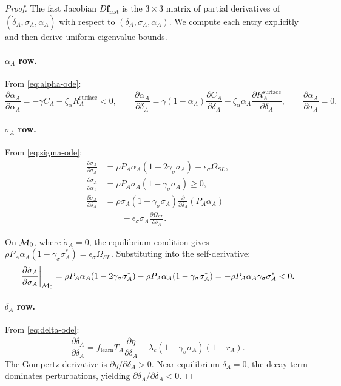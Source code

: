 \begin{proof}
The fast Jacobian $D\mathbf{f}_{\mathrm{fast}}$ is the $3 \times 3$ matrix
of partial derivatives of $(\dot{\delta}_A, \dot{\sigma}_A, \dot{\alpha}_A)$
with respect to $(\delta_A, \sigma_A, \alpha_A)$. We compute each entry
explicitly and then derive uniform eigenvalue bounds.

\paragraph{$\alpha_A$ row.}
From \eqref{eq:alpha-ode}:
\[
\frac{\partial \dot{\alpha}_A}{\partial \alpha_A}
= -\gamma C_A - \zeta_\alpha R_A^{\mathrm{surface}} < 0,
\qquad
\frac{\partial \dot{\alpha}_A}{\partial \delta_A}
= \gamma (1 - \alpha_A) \frac{\partial C_A}{\partial \delta_A}
- \zeta_\alpha \alpha_A \frac{\partial R_A^{\mathrm{surface}}}{\partial \delta_A},
\qquad
\frac{\partial \dot{\alpha}_A}{\partial \sigma_A} = 0.
\]

\paragraph{$\sigma_A$ row.}
From \eqref{eq:sigma-ode}:
\begin{align*}
\frac{\partial \dot{\sigma}_A}{\partial \sigma_A}
&= \rho P_A \alpha_A (1 - 2\gamma_\sigma \sigma_A) - \epsilon_\sigma \Omega_{SL},\\[2pt]
\frac{\partial \dot{\sigma}_A}{\partial \alpha_A}
&= \rho P_A \sigma_A (1 - \gamma_\sigma \sigma_A) \geq 0,\\[2pt]
\frac{\partial \dot{\sigma}_A}{\partial \delta_A}
&= \rho \sigma_A (1 - \gamma_\sigma \sigma_A) \frac{\partial}{\partial \delta_A}(P_A \alpha_A) \\
&\qquad - \epsilon_\sigma \sigma_A \frac{\partial \Omega_{SL}}{\partial \delta_A}.
\end{align*}

On $\mathcal{M}_0$, where $\dot{\sigma}_A = 0$, the equilibrium condition gives
$\rho P_A \alpha_A (1 - \gamma_\sigma \sigma_A^*) = \epsilon_\sigma \Omega_{SL}$.
Substituting into the self-derivative:
\[
\left.\frac{\partial \dot{\sigma}_A}{\partial \sigma_A}\right|_{\mathcal{M}_0}
= \rho P_A \alpha_A (1 - 2\gamma_\sigma \sigma_A^*) - \rho P_A \alpha_A (1 - \gamma_\sigma \sigma_A^*)
= -\rho P_A \alpha_A \gamma_\sigma \sigma_A^* < 0.
\]

\paragraph{$\delta_A$ row.}
From \eqref{eq:delta-ode}:
\[
\frac{\partial \dot{\delta}_A}{\partial \delta_A}
= f_{\mathrm{learn}} T_A \frac{\partial \eta}{\partial \delta_A}
- \lambda_c (1 - \gamma_\sigma \sigma_A) (1 - r_A).
\]
The Gompertz derivative is $\partial \eta / \partial \delta_A > 0$.
Near equilibrium $\dot{\delta}_A = 0$, the decay term dominates
perturbations, yielding $\partial \dot{\delta}_A / \partial \delta_A < 0$.


\end{proof}
